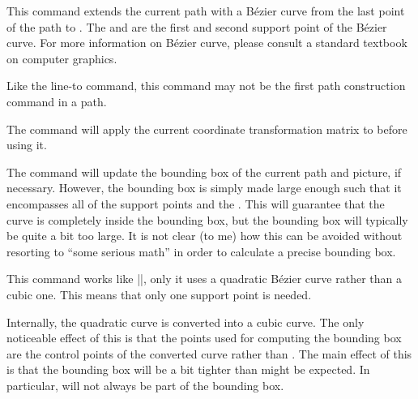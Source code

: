 \begin{command}{\pgfpathcurveto{}}
  This command extends the current path with a Bézier curve from the
  last point of the path to  . The 
  and  are the first and second support point of the
  Bézier curve. For more information on Bézier curve, please consult a
  standard textbook on computer graphics.

  Like the line-to command, this command may not be the first path
  construction command in a path.
\begin{codeexample}[]
\begin{pgfpicture}
  \pgfpathmoveto{\pgfpointorigin}
  \pgfpathcurveto
    {\pgfpoint{1cm}{1cm}}{\pgfpoint{2cm}{1cm}}{\pgfpoint{3cm}{0cm}}
\end{pgfpicture}
\end{codeexample}
  The command will apply the current coordinate transformation matrix
  to  before using it.

  The command will update the bounding box of the current path and
  picture, if necessary. However, the bounding box is simply made
  large enough such that it encompasses all of the support points and
  the . This will guarantee that the curve is
  completely inside the bounding box, but the bounding box will
  typically be quite a bit too large. It is not clear (to me) how this
  can be avoided without resorting to ``some serious math'' in order
  to calculate a precise bounding box.
\end{command}

\begin{command}{\pgfpathquadraticcurveto{}}
  This command works like |\pgfpathcurveto|, only it uses a quadratic
  Bézier curve rather than a cubic one. This means that only one
  support point is needed.
\begin{codeexample}[]
\begin{pgfpicture}
  \pgfpathmoveto{\pgfpointorigin}
  \pgfpathquadraticcurveto
    {\pgfpoint{1cm}{1cm}}{\pgfpoint{2cm}{0cm}}
\end{pgfpicture}
\end{codeexample}
  Internally, the quadratic curve is converted into a cubic
  curve. The only noticeable effect of this is that the points used for
  computing the bounding box are the control points of the converted
  curve rather than . The main effect of this is that
  the bounding box will be a bit tighter than might be expected. In
  particular,  will not always be part of the bounding
  box.
\end{command}


